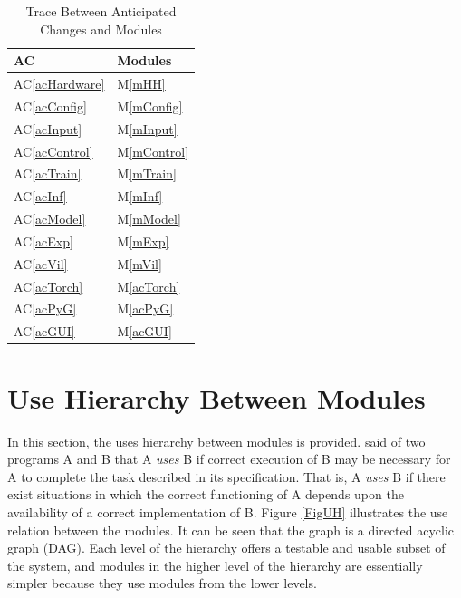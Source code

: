 \documentclass[12pt, titlepage]{article}
\newcommand{\acref}[1]{AC\ref{#1}}
\newcommand{\mref}[1]{M\ref{#1}}
\begin{document}
\begin{table}[H]
\centering
\begin{tabular}{p{} p{}}
\toprule
\textbf{AC} & \textbf{Modules}\\
\midrule
\acref{acHardware} & \mref{mHH}\\
\acref{acConfig} & \mref{mConfig}\\
\acref{acInput} & \mref{mInput}\\
\acref{acControl} & \mref{mControl}\\
\acref{acTrain} & \mref{mTrain}\\
\acref{acInf} & \mref{mInf}\\
\acref{acModel} & \mref{mModel}\\
\acref{acExp} & \mref{mExp}\\
\acref{acVil} & \mref{mVil}\\
\acref{acTorch} & \mref{acTorch}\\
\acref{acPyG} & \mref{acPyG}\\
\acref{acGUI} & \mref{acGUI}\\
\bottomrule
\end{tabular}
\caption{Trace Between Anticipated Changes and Modules}
\label{TblACT}
\end{table}

\section{Use Hierarchy Between Modules} \label{SecUse}

In this section, the uses hierarchy between modules is
provided. \citet{Parnas1978} said of two programs A and B that A {\em uses} B if
correct execution of B may be necessary for A to complete the task described in
its specification. That is, A {\em uses} B if there exist situations in which
the correct functioning of A depends upon the availability of a correct
implementation of B.  Figure \ref{FigUH} illustrates the use relation between
the modules. It can be seen that the graph is a directed acyclic graph
(DAG). Each level of the hierarchy offers a testable and usable subset of the
system, and modules in the higher level of the hierarchy are essentially simpler
because they use modules from the lower levels.
\end{document}
